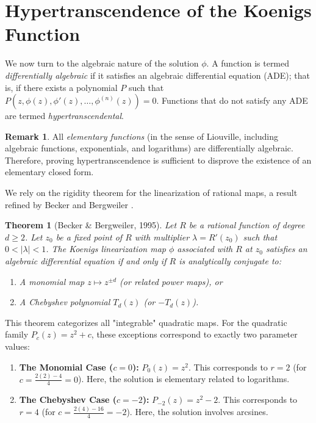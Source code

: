 \documentclass[11pt, a4paper]{article}
\newtheorem{theorem}{Theorem}[section]
\theoremstyle{definition}
\newtheorem{remark}{Remark}[section]
\begin{document}
\section{Hypertranscendence of the Koenigs Function}

We now turn to the algebraic nature of the solution $\phi$. A function is termed \textit{differentially algebraic} if it satisfies an algebraic differential equation (ADE); that is, if there exists a polynomial $P$ such that $P(z, \phi(z), \phi'(z), \dots, \phi^{(n)}(z)) = 0$. Functions that do not satisfy any ADE are termed \textit{hypertranscendental}.

\begin{remark}
All \textit{elementary functions} (in the sense of Liouville, including algebraic functions, exponentials, and logarithms) are differentially algebraic. Therefore, proving hypertranscendence is sufficient to disprove the existence of an elementary closed form.
\end{remark}

We rely on the rigidity theorem for the linearization of rational maps, a result refined by Becker and Bergweiler \cite{Becker1995}.

\begin{theorem}[Becker \& Bergweiler, 1995]
Let $R$ be a rational function of degree $d \geq 2$. Let $z_0$ be a fixed point of $R$ with multiplier $\lambda = R'(z_0)$ such that $0 < |\lambda| < 1$. The Koenigs linearization map $\phi$ associated with $R$ at $z_0$ satisfies an algebraic differential equation if and only if $R$ is analytically conjugate to:
\begin{enumerate}
\item A monomial map $z \mapsto z^{\pm d}$ (or related power maps), or
\item A Chebyshev polynomial $T_d(z)$ (or $-T_d(z)$).
\end{enumerate}
\end{theorem}

This theorem categorizes all "integrable" quadratic maps. For the quadratic family $P_c(z) = z^2 + c$, these exceptions correspond to exactly two parameter values:
\begin{enumerate}
\item \textbf{The Monomial Case ($c=0$):} $P_0(z) = z^2$. This corresponds to $r=2$ (for $c = \frac{2(2)-4}{4} = 0$). Here, the solution is elementary related to logarithms.
\item \textbf{The Chebyshev Case ($c=-2$):} $P_{-2}(z) = z^2 - 2$. This corresponds to $r=4$ (for $c = \frac{2(4)-16}{4} = -2$). Here, the solution involves arcsines.
\end{enumerate}
\end{document}
